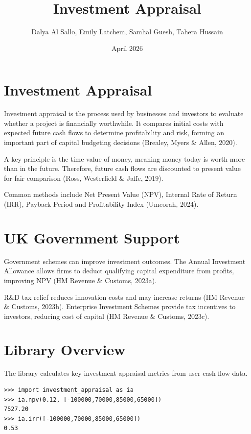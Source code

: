 \documentclass[10pt]{article}
\title{\vspace{-1cm}Investment Appraisal}
\author{Dalya Al Sallo, Emily Latchem, Samhal Guesh, Tahera Hussain}
\date{April 2026}
\begin{document}
\maketitle
\vspace{-1cm}

\section{Investment Appraisal}

Investment appraisal is the process used by businesses and investors to evaluate whether a project is financially worthwhile. It compares initial costs with expected future cash flows to determine profitability and risk, forming an important part of capital budgeting decisions (Brealey, Myers \& Allen, 2020).

A key principle is the time value of money, meaning money today is worth more than in the future. Therefore, future cash flows are discounted to present value for fair comparison (Ross, Westerfield \& Jaffe, 2019).

Common methods include Net Present Value (NPV), Internal Rate of Return (IRR), Payback Period and Profitability Index (Umeorah, 2024).

\section{UK Government Support}

Government schemes can improve investment outcomes. The Annual Investment Allowance allows firms to deduct qualifying capital expenditure from profits, improving NPV (HM Revenue \& Customs, 2023a).

R\&D tax relief reduces innovation costs and may increase returns (HM Revenue \& Customs, 2023b). Enterprise Investment Schemes provide tax incentives to investors, reducing cost of capital (HM Revenue \& Customs, 2023c).

\section{Library Overview}

The library calculates key investment appraisal metrics from user cash flow data.

\begin{verbatim}
>>> import investment_appraisal as ia
>>> ia.npv(0.12, [-100000,70000,85000,65000])
7527.20
>>> ia.irr([-100000,70000,85000,65000])
0.53
\end{verbatim}
\end{document}
